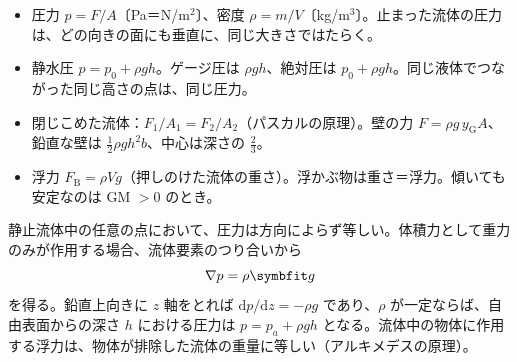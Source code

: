 \begin{taisetsu}
\begin{itemize}[leftmargin=1.2\zw, itemsep=2pt, topsep=0pt, label={\color{bkNavy}●}]
\item 圧力 $p=F/A$〔Pa＝N/m$^2$〕、密度 $\rho=m/V$〔kg/m$^3$〕。止まった流体の圧力は、どの向きの面にも垂直に、同じ大きさではたらく。
\item 静水圧 $p=p_0+\rho gh$。ゲージ圧は $\rho gh$、絶対圧は $p_0+\rho gh$。同じ液体でつながった同じ高さの点は、同じ圧力。
\item 閉じこめた流体：$F_1/A_1=F_2/A_2$（パスカルの原理）。壁の力 $F=\rho g\,y_{\mathrm{G}}A$、鉛直な壁は $\tfrac{1}{2}\rho gh^2b$、中心は深さの $\tfrac{2}{3}$。
\item 浮力 $F_{\mathrm{B}}=\rho Vg$（押しのけた流体の重さ）。浮かぶ物は重さ＝浮力。傾いても安定なのは GM $>0$ のとき。
\end{itemize}
\end{taisetsu}

\begin{kotoba}\small
{}
\end{kotoba}

\begin{senmonsho}[静止流体の圧力]
\begin{bkhonbun}
静止流体中の任意の点において、圧力は方向によらず等しい。体積力として重力のみが作用する場合、流体要素のつり合いから
\[ \nabla p=\rho\symbfit g \]
を得る。鉛直上向きに $z$ 軸をとれば $\mathrm{d}p/\mathrm{d}z=-\rho g$ であり、$\rho$ が一定ならば、自由表面からの深さ $h$ における圧力は $p=p_a+\rho gh$ となる。流体中の物体に作用する浮力は、物体が排除した流体の重量に等しい（アルキメデスの原理）。
\end{bkhonbun}
\end{senmonsho}


